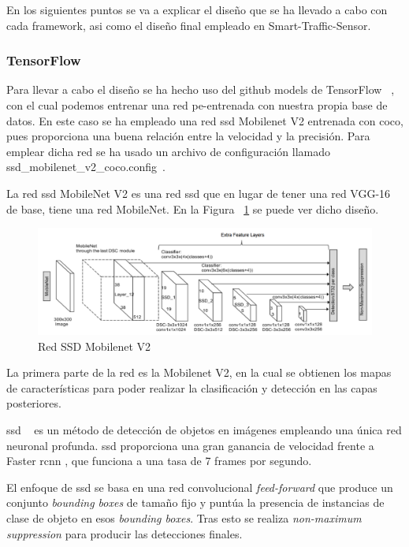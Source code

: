 En los siguientes puntos se va a explicar el diseño que se ha llevado a cabo con cada framework, asi como el diseño final empleado en Smart-Traffic-Sensor.

\subsubsection{TensorFlow}

Para llevar a cabo el diseño se ha hecho uso del github models de TensorFlow ~\cite{tensorflow_models}, con el cual podemos entrenar una red pe-entrenada con nuestra propia base de datos. En este caso se ha empleado una red \acrfull{ssd} Mobilenet V2 entrenada con \acrshort{coco}, pues proporciona una buena relación entre la velocidad y la precisión. Para emplear dicha red se ha usado un archivo de configuración llamado ssd\_mobilenet\_v2\_coco.config~\cite{ssd_mobilenetv2_config}.

La red \acrshort{ssd} MobileNet V2 es una red \acrshort{ssd} que en lugar de tener una red VGG-16 de base, tiene una red MobileNet. En la Figura ~\ref{fig.ssd_mobilenet} se puede ver dicho diseño.

\begin{figure}[H] 
\begin{center}
	\includegraphics[width=1\textwidth]{figures/Diseno_global/ssd_mobilenet.png}
   \caption{Red SSD Mobilenet V2}
	\label{fig.ssd_mobilenet}
\end{center}
\end{figure}

La primera parte de la red es la Mobilenet V2, en la cual se obtienen los mapas de características para poder realizar la clasificación y detección en las capas posteriores. 

\acrshort{ssd} ~\cite{ssd_article} es un método de detección de objetos en imágenes empleando una única red neuronal profunda. \acrshort{ssd} proporciona una gran ganancia de velocidad frente a Faster \acrshort{rcnn} \cite{rcnn_faster}, que funciona a una tasa de 7 frames por segundo.

El enfoque de \acrshort{ssd} se basa en una red convolucional \textit{feed-forward} que produce un conjunto \textit{bounding boxes} de tamaño fijo y puntúa la presencia de instancias de clase de objeto en esos \textit{bounding boxes}. Tras esto se realiza \textit{non-maximum suppression} para producir las detecciones finales. 

